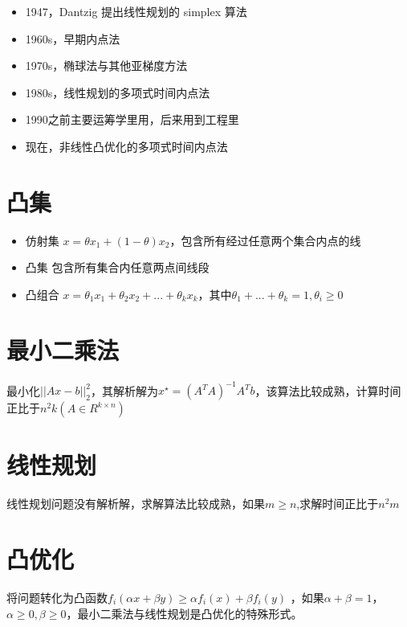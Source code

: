 \documentclass[]{book}
\begin{document}
\begin{itemize}
\item
  1947，Dantzig 提出线性规划的 simplex 算法
\item
  1960s，早期内点法
\item
  1970s，椭球法与其他亚梯度方法
\item
  1980s，线性规划的多项式时间内点法
\item
  1990之前主要运筹学里用，后来用到工程里
\item
  现在，非线性凸优化的多项式时间内点法
\end{itemize}

\hypertarget{ux51f8ux96c6}{%
\section{凸集}\label{ux51f8ux96c6}}

\begin{itemize}
\item
  仿射集 \(x = \theta x_1 + (1-\theta)x_2\)，包含所有经过任意两个集合内点的线
\item
  凸集 包含所有集合内任意两点间线段
\item
  凸组合 \(x = \theta_1x_1+\theta_2x_2+...+\theta_kx_k\)，其中\(\theta_1+...+\theta_k = 1, \theta_i \geq 0\)
\end{itemize}

\hypertarget{ux6700ux5c0fux4e8cux4e58ux6cd5}{%
\section{最小二乘法}\label{ux6700ux5c0fux4e8cux4e58ux6cd5}}

最小化\(||Ax-b||_2^2\)，其解析解为\(x^\star = (A^TA)^{-1}A^Tb\)，该算法比较成熟，计算时间正比于\(n^2k(A\in R^{k\times n})\)

\hypertarget{ux7ebfux6027ux89c4ux5212}{%
\section{线性规划}\label{ux7ebfux6027ux89c4ux5212}}

线性规划问题没有解析解，求解算法比较成熟，如果\(m\geq n\),求解时间正比于\(n^2m\)

\hypertarget{ux51f8ux4f18ux5316}{%
\section{凸优化}\label{ux51f8ux4f18ux5316}}

将问题转化为凸函数\(f_i(\alpha x+\beta y)\geq \alpha f_i(x)+\beta f_i(y)\) ，如果\(\alpha + \beta = 1\)，\(\alpha \geq 0, \beta\geq 0\)，最小二乘法与线性规划是凸优化的特殊形式。
\end{document}
